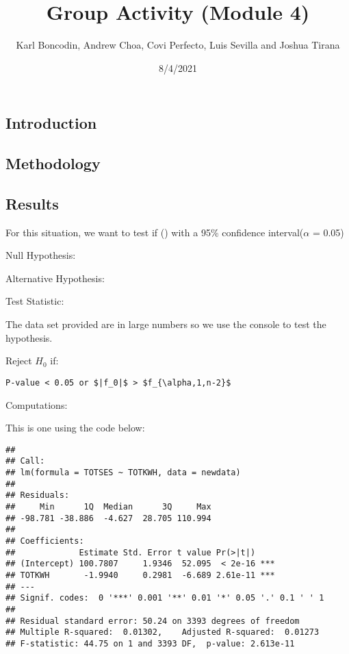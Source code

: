 \documentclass[
]{article}
\title{Group Activity (Module 4)}
\author{Karl Boncodin, Andrew Choa, Covi Perfecto, Luis Sevilla and
Joshua Tirana}
\date{8/4/2021}
\newenvironment{Shaded}{\begin{snugshade}}{\end{snugshade}}
\newcommand{\AttributeTok}[1]{\textcolor[rgb]{0.77,0.63,0.00}{#1}}
\newcommand{\FunctionTok}[1]{\textcolor[rgb]{0.00,0.00,0.00}{#1}}
\newcommand{\NormalTok}[1]{#1}
\newcommand{\OtherTok}[1]{\textcolor[rgb]{0.56,0.35,0.01}{#1}}
\newcommand{\SpecialCharTok}[1]{\textcolor[rgb]{0.00,0.00,0.00}{#1}}
\begin{document}
\maketitle

\hypertarget{introduction}{%
\subsection{Introduction}\label{introduction}}

\hypertarget{methodology}{%
\subsection{Methodology}\label{methodology}}

\hypertarget{results}{%
\subsection{Results}\label{results}}

For this situation, we want to test if () with a 95\% confidence
interval(\(\alpha\) = 0.05)

Null Hypothesis:

Alternative Hypothesis:

Test Statistic:

The data set provided are in large numbers so we use the console to test
the hypothesis.

Reject \(H_0\) if:

\begin{verbatim}
P-value < 0.05 or $|f_0|$ > $f_{\alpha,1,n-2}$
\end{verbatim}

Computations:

This is one using the code below:

\begin{Shaded}
\end{Shaded}

\begin{verbatim}
## 
## Call:
## lm(formula = TOTSES ~ TOTKWH, data = newdata)
## 
## Residuals:
##     Min      1Q  Median      3Q     Max 
## -98.781 -38.886  -4.627  28.705 110.994 
## 
## Coefficients:
##             Estimate Std. Error t value Pr(>|t|)    
## (Intercept) 100.7807     1.9346  52.095  < 2e-16 ***
## TOTKWH       -1.9940     0.2981  -6.689 2.61e-11 ***
## ---
## Signif. codes:  0 '***' 0.001 '**' 0.01 '*' 0.05 '.' 0.1 ' ' 1
## 
## Residual standard error: 50.24 on 3393 degrees of freedom
## Multiple R-squared:  0.01302,    Adjusted R-squared:  0.01273 
## F-statistic: 44.75 on 1 and 3393 DF,  p-value: 2.613e-11
\end{verbatim}
\end{document}
